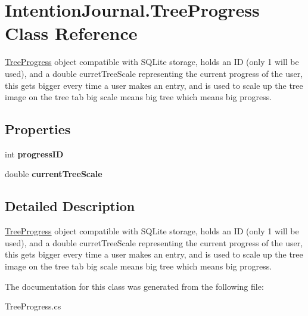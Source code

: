 \hypertarget{class_intention_journal_1_1_tree_progress}{}\section{Intention\+Journal.\+Tree\+Progress Class Reference}
\label{class_intention_journal_1_1_tree_progress}


\hyperlink{class_intention_journal_1_1_tree_progress}{Tree\+Progress} object compatible with S\+Q\+Lite storage, holds an ID (only 1 will be used), and a double curret\+Tree\+Scale representing the current progress of the user, this gets bigger every time a user makes an entry, and is used to scale up the tree image on the tree tab big scale means big tree which means big progress.  


\subsection*{Properties}
\begin{DoxyCompactItemize}
\item 
\mbox{\label{class_intention_journal_1_1_tree_progress_a027f1ea4b3cb49cdc5aaff4c2b9f44ff}} 
int {\bfseries progress\+ID}
\item 
\mbox{\label{class_intention_journal_1_1_tree_progress_a17c5715c3805abbe989a5f31463f3a68}} 
double {\bfseries current\+Tree\+Scale}
\end{DoxyCompactItemize}


\subsection{Detailed Description}
\hyperlink{class_intention_journal_1_1_tree_progress}{Tree\+Progress} object compatible with S\+Q\+Lite storage, holds an ID (only 1 will be used), and a double curret\+Tree\+Scale representing the current progress of the user, this gets bigger every time a user makes an entry, and is used to scale up the tree image on the tree tab big scale means big tree which means big progress. 



The documentation for this class was generated from the following file\+:\begin{DoxyCompactItemize}
\item 
Tree\+Progress.\+cs\end{DoxyCompactItemize}
